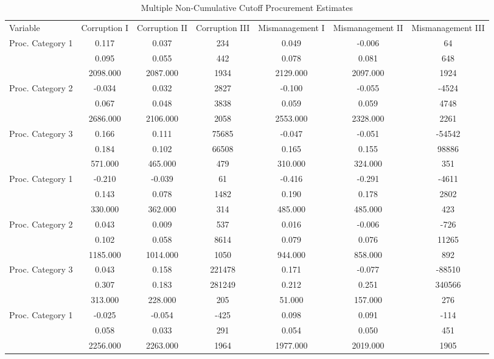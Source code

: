 \begin{table}[!htbp]
\centering
\caption{Multiple Non-Cumulative Cutoff Procurement Estimates} 
\label{tab:rdmc}
\begingroup\scriptsize
\begin{tabular}{lcccccc}
  \hline
\hline
Variable & Corruption I & Corruption II & Corruption III & Mismanagement I & Mismanagement II & Mismanagement III \\ 
 Proc. Category 1 & 0.117 & 0.037 & 234 & 0.049 & -0.006 & 64 \\ 
    & 0.095 & 0.055 & 442 & 0.078 & 0.081 & 648 \\ 
    & 2098.000 & 2087.000 & 1934 & 2129.000 & 2097.000 & 1924 \\ 
  Proc. Category 2 & -0.034 & 0.032 & 2827 & -0.100 & -0.055 & -4524 \\ 
    & 0.067 & 0.048 & 3838 & 0.059 & 0.059 & 4748 \\ 
    & 2686.000 & 2106.000 & 2058 & 2553.000 & 2328.000 & 2261 \\ 
  Proc. Category 3 & 0.166 & 0.111 & 75685 & -0.047 & -0.051 & -54542 \\ 
    & 0.184 & 0.102 & 66508 & 0.165 & 0.155 & 98886 \\ 
    & 571.000 & 465.000 & 479 & 310.000 & 324.000 & 351 \\ 
   \hline
Proc. Category 1 & -0.210 & -0.039 & 61 & -0.416 & -0.291 & -4611 \\ 
    & 0.143 & 0.078 & 1482 & 0.190 & 0.178 & 2802 \\ 
    & 330.000 & 362.000 & 314 & 485.000 & 485.000 & 423 \\ 
  Proc. Category 2 & 0.043 & 0.009 & 537 & 0.016 & -0.006 & -726 \\ 
    & 0.102 & 0.058 & 8614 & 0.079 & 0.076 & 11265 \\ 
    & 1185.000 & 1014.000 & 1050 & 944.000 & 858.000 & 892 \\ 
  Proc. Category 3 & 0.043 & 0.158 & 221478 & 0.171 & -0.077 & -88510 \\ 
    & 0.307 & 0.183 & 281249 & 0.212 & 0.251 & 340566 \\ 
    & 313.000 & 228.000 & 205 & 51.000 & 157.000 & 276 \\ 
   \hline
Proc. Category 1 & -0.025 & -0.054 & -425 & 0.098 & 0.091 & -114 \\ 
    & 0.058 & 0.033 & 291 & 0.054 & 0.050 & 451 \\ 
    & 2256.000 & 2263.000 & 1964 & 1977.000 & 2019.000 & 1905 \\ 

\end{tabular}
\end{table}
